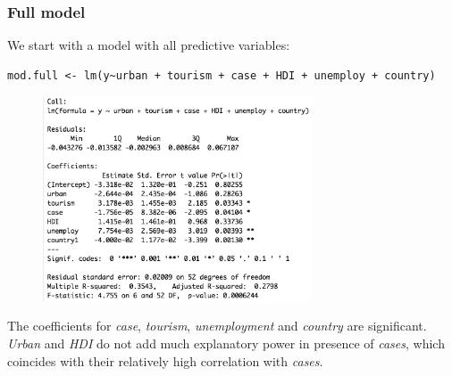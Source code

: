 \documentclass{article}
\begin{document}
\subsubsection*{Full model}
\noindent We start with a model with all predictive variables:
\begin{verbatim}
mod.full <- lm(y~urban + tourism + case + HDI + unemploy + country)
\end{verbatim}
\begin{figure}[H]
\centering
  \includegraphics[width=8cm]{summary-full.png}
  \label{fig:summaryfull}
\end{figure}
\noindent The coefficients for \textit{case}, \textit{tourism}, \textit{unemployment} and \textit{country} are significant. \textit{Urban} and \textit{HDI} do not add much explanatory power in presence of \textit{cases}, which coincides with their relatively high correlation with \textit{cases}.
\end{document}
